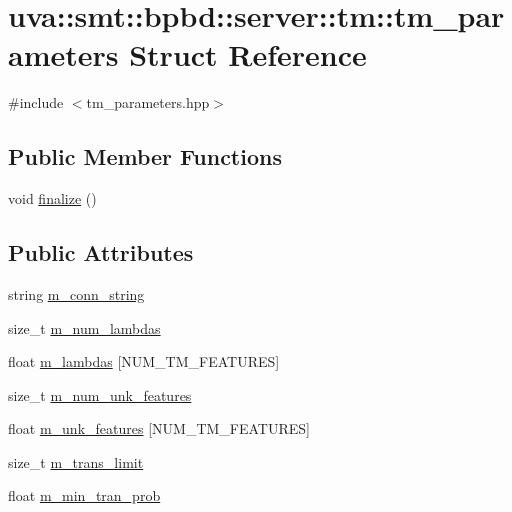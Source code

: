 \hypertarget{structuva_1_1smt_1_1bpbd_1_1server_1_1tm_1_1tm__parameters}{}\section{uva\+:\+:smt\+:\+:bpbd\+:\+:server\+:\+:tm\+:\+:tm\+\_\+parameters Struct Reference}
\label{structuva_1_1smt_1_1bpbd_1_1server_1_1tm_1_1tm__parameters}


{\ttfamily \#include $<$tm\+\_\+parameters.\+hpp$>$}

\subsection*{Public Member Functions}
\begin{DoxyCompactItemize}
\item 
void \hyperlink{structuva_1_1smt_1_1bpbd_1_1server_1_1tm_1_1tm__parameters_a62c75095cb2c90a4e0efdbb5af2ac9b1}{finalize} ()
\end{DoxyCompactItemize}
\subsection*{Public Attributes}
\begin{DoxyCompactItemize}
\item 
string \hyperlink{structuva_1_1smt_1_1bpbd_1_1server_1_1tm_1_1tm__parameters_a6bdca6bec5481148be47c16d75d70a48}{m\+\_\+conn\+\_\+string}
\item 
size\+\_\+t \hyperlink{structuva_1_1smt_1_1bpbd_1_1server_1_1tm_1_1tm__parameters_a19d5ff875562172e6249e96947fe6002}{m\+\_\+num\+\_\+lambdas}
\item 
float \hyperlink{structuva_1_1smt_1_1bpbd_1_1server_1_1tm_1_1tm__parameters_a761a258aaa6b6652c268741ae732a882}{m\+\_\+lambdas} \mbox{[}N\+U\+M\+\_\+\+T\+M\+\_\+\+F\+E\+A\+T\+U\+R\+E\+S\mbox{]}
\item 
size\+\_\+t \hyperlink{structuva_1_1smt_1_1bpbd_1_1server_1_1tm_1_1tm__parameters_a40a41b7331f9f582eeeb0a6d9629aac5}{m\+\_\+num\+\_\+unk\+\_\+features}
\item 
float \hyperlink{structuva_1_1smt_1_1bpbd_1_1server_1_1tm_1_1tm__parameters_a441e613ed28b4998341aaed3893bbd0f}{m\+\_\+unk\+\_\+features} \mbox{[}N\+U\+M\+\_\+\+T\+M\+\_\+\+F\+E\+A\+T\+U\+R\+E\+S\mbox{]}
\item 
size\+\_\+t \hyperlink{structuva_1_1smt_1_1bpbd_1_1server_1_1tm_1_1tm__parameters_aca1973cf0099cb3cb94ddff5d52be20f}{m\+\_\+trans\+\_\+limit}
\item 
float \hyperlink{structuva_1_1smt_1_1bpbd_1_1server_1_1tm_1_1tm__parameters_a061ad92529a12c4c0cb8507c3f35e52e}{m\+\_\+min\+\_\+tran\+\_\+prob}
\end{DoxyCompactItemize}


